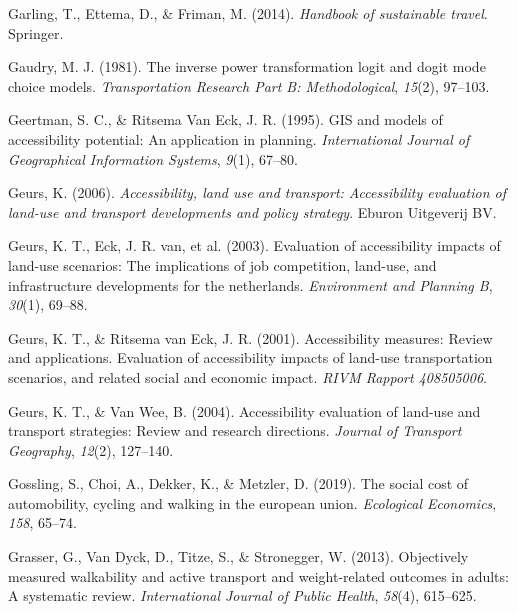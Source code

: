 \documentclass[12pt,twoside]{reedthesis}
\newlength{\cslhangindent}
\newenvironment{CSLReferences}[2] %
 {%
  \setlength{\parindent}{0pt}
  \ifodd #1 \everypar{\setlength{\hangindent}{\cslhangindent}}\ignorespaces\fi
  \ifnum #2 > 0
  \setlength{\parskip}{#2\baselineskip}
  \fi
 }%
 {}
\begin{document}
\begin{CSLReferences}{1}{0}
\leavevmode{}%
Garling, T., Ettema, D., \& Friman, M. (2014). \emph{Handbook of sustainable travel}. Springer.

\leavevmode{}%
Gaudry, M. J. (1981). The inverse power transformation logit and dogit mode choice models. \emph{Transportation Research Part B: Methodological}, \emph{15}(2), 97--103.

\leavevmode{}%
Geertman, S. C., \& Ritsema Van Eck, J. R. (1995). GIS and models of accessibility potential: An application in planning. \emph{International Journal of Geographical Information Systems}, \emph{9}(1), 67--80.

\leavevmode{}%
Geurs, K. (2006). \emph{Accessibility, land use and transport: Accessibility evaluation of land-use and transport developments and policy strategy}. Eburon Uitgeverij BV.

\leavevmode{}%
Geurs, K. T., Eck, J. R. van, et al. (2003). Evaluation of accessibility impacts of land-use scenarios: The implications of job competition, land-use, and infrastructure developments for the netherlands. \emph{Environment and Planning B}, \emph{30}(1), 69--88.

\leavevmode{}%
Geurs, K. T., \& Ritsema van Eck, J. R. (2001). Accessibility measures: Review and applications. Evaluation of accessibility impacts of land-use transportation scenarios, and related social and economic impact. \emph{RIVM Rapport 408505006}.

\leavevmode{}%
Geurs, K. T., \& Van Wee, B. (2004). Accessibility evaluation of land-use and transport strategies: Review and research directions. \emph{Journal of Transport Geography}, \emph{12}(2), 127--140.

\leavevmode{}%
Gossling, S., Choi, A., Dekker, K., \& Metzler, D. (2019). The social cost of automobility, cycling and walking in the european union. \emph{Ecological Economics}, \emph{158}, 65--74.

\leavevmode{}%
Grasser, G., Van Dyck, D., Titze, S., \& Stronegger, W. (2013). Objectively measured walkability and active transport and weight-related outcomes in adults: A systematic review. \emph{International Journal of Public Health}, \emph{58}(4), 615--625.


\end{CSLReferences}
\end{document}
